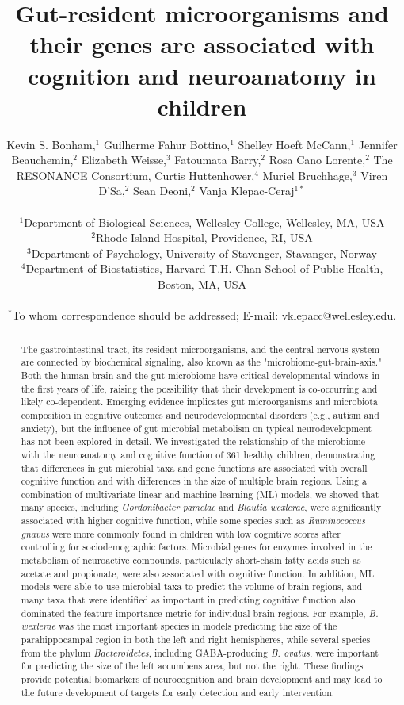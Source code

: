 \documentclass{article}
\title{Gut-resident microorganisms and their genes are associated with cognition and neuroanatomy in children}
\author{%
    \parbox{\linewidth}{\centering
        Kevin S. Bonham,$^{1}$
        Guilherme Fahur Bottino,$^{1}$
        Shelley Hoeft McCann,$^{1}$
        Jennifer Beauchemin,$^{2}$
        Elizabeth Weisse,$^{3}$
        Fatoumata Barry,$^{2}$
        Rosa Cano Lorente,$^{2}$
        The RESONANCE Consortium,
        Curtis Huttenhower,$^{4}$
        Muriel Bruchhage,$^{3}$
        Viren D'Sa,$^{2}$
        Sean Deoni,$^{2}$
        Vanja Klepac-Ceraj$^{1\ast}$
    }
\\
\normalsize{$^{1}$Department of Biological Sciences, Wellesley College, Wellesley, MA, USA}\\
\normalsize{$^{2}$Rhode Island Hospital, Providence, RI, USA}\\
\normalsize{$^{3}$Department of Psychology, University of Stavenger, Stavanger, Norway}\\
\normalsize{$^{4}$Department of Biostatistics, Harvard T.H. Chan School of Public Health, Boston, MA, USA}\\
\\
\normalsize{$^\ast$To whom correspondence should be addressed; E-mail:  vklepacc@wellesley.edu.}
}
\date{}
\begin{document}
\baselineskip24pt

\maketitle 

\begin{abstract}
The gastrointestinal tract, its resident microorganisms, and the central
nervous system are connected by biochemical signaling, also known as the
"microbiome-gut-brain-axis." Both the human brain and the gut microbiome
have critical developmental windows in the first years of life,
raising the possibility that their development is co-occurring and
likely co-dependent. Emerging evidence implicates gut microorganisms and
microbiota composition in cognitive outcomes and neurodevelopmental
disorders (e.g., autism and anxiety), but the influence of gut microbial
metabolism on typical neurodevelopment has not been explored in detail.
We investigated the relationship of the microbiome with the neuroanatomy
and cognitive function of 361 healthy children, demonstrating that
differences in gut microbial taxa and gene functions are associated with
overall cognitive function and with differences in the size of
multiple brain regions.
Using a combination of multivariate linear and machine learning (ML) models,
we showed that many species,
including \emph{Gordonibacter pamelae} and \emph{Blautia wexlerae}, were
significantly associated with higher cognitive function, while some
species such as \emph{Ruminococcus gnavus} were more commonly found in
children with low cognitive scores after controlling for sociodemographic factors.
Microbial genes for enzymes involved in the metabolism of
neuroactive compounds, particularly short-chain fatty acids such as
acetate and propionate, were also associated with cognitive function.
In addition, ML models were able to use microbial taxa to predict the
volume of brain regions, and many taxa that were identified
as important in predicting cognitive function also dominated the
feature importance metric for individual brain regions. For example, \emph{B.
wexlerae} was the most important species in models predicting the size of the parahippocampal region
in both the left and right hemispheres, while several species from
the phylum \textit{Bacteroidetes}, including GABA-producing
\emph{B. ovatus}, were important for predicting
the size of the left accumbens area, but not the right. These
findings provide potential biomarkers of neurocognition and brain development
and may lead to the future development of targets for early detection and early
intervention.
\end{abstract}
\end{document}
